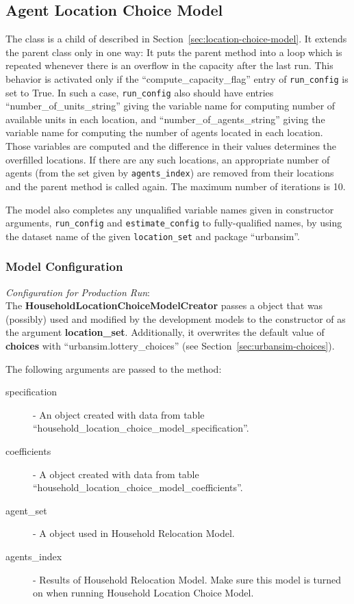 %
\subsection{Agent Location Choice Model}
\modelsindex
%
\label{sec:agent-lcm}

The class  is a child
of  described in
Section~\ref{sec:location-choice-model}. It extends the
parent class only in one way: It puts the parent method
 into a loop which is repeated whenever there is an
overflow in the capacity after the last run. This behavior is
activated only if the ``compute_capacity_flag'' entry of
\verb|run_config| is set to True. In such a case, \verb|run_config|
also should have entries ``number_of_units_string'' giving the
variable name for computing number of available
units in each location, and ``number_of_agents_string'' giving the
variable name for computing the number of agents
located in each location. Those variables are
computed and the difference in their values determines the
overfilled locations. If there are any such locations, an
appropriate number of agents (from the set given by
\verb|agents_index|) are removed from their locations and the parent
 method is called again. The maximum number of
iterations is 10.

The model also completes any unqualified variable names given in constructor
arguments, \verb|run_config| and \verb|estimate_config| to fully-qualified
names, by using the dataset name of the given \verb|location_set| and package
``urbansim''.


\subsubsection{Model Configuration}
\modelsindex
%
{\em Configuration for Production Run}:\\[1mm]
The {\bf HouseholdLocationChoiceModelCreator} passes a
 object that was (possibly) used and modified by the
development models to the constructor of  as
the argument {\bf location_set}. Additionally, it overwrites the default
value of {\bf choices} with ``urbansim.lottery_choices'' (see
Section~\ref{sec:urbansim-choices}).

The following arguments are passed to
  the  method:
\begin{description}
\item[specification] - An  object created with
  data from table ``household_location_choice_model_specification''. 
\item[coefficients] - A  object created with data from
  table ``household_location_choice_model_coefficients''. 
\item[agent_set] - A  object used in Household Relocation
  Model. 
\item[agents_index] - Results of Household Relocation Model. Make sure this model is turned on 
when running Household Location Choice Model.
\end{description}

